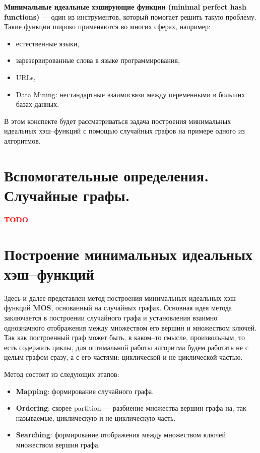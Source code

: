 \documentclass[specialist,
               substylefile = spbu.rtx,
               subf,href,colorlinks=true, 12pt]{disser}
\begin{document}
\textbf{Минимальные идеальные хэширующие функции (minimal perfect hash functions)} --- один из инструментов, который помогает решить такую проблему. Такие функции широко применяются во многих сферах, например:

\begin{itemize}
\item естественные языки,
\item зарезервированные слова в языке программирования,
\item URLs,
\item Data Mining: нестандартные взаимосвязи между переменными в больших базах данных.
\end{itemize}

В этом конспекте будет рассматриваться задача построения минимальных идеальных хэш--функций с помощью случайных графов на примере одного из алгоритмов.

\newpage

\section{Вспомогательные определения. Случайные графы.}

\textcolor{red}{\textbf{TODO}}

\newpage

\section{Построение минимальных идеальных хэш--функций}

Здесь и далее представлен метод построения минимальных идеальных хэш--функций \textbf{MOS}, основанный на случайных графах.
Основная идея метода заключается в построении случайного графа и установления взаимно однозначного отображения между множеством его вершин и множеством ключей. Так как построенный граф может быть, в каком--то смысле, произвольным, то есть содержать циклы, для оптимальной работы алгоритма будем работать не с целым графом сразу, а с его частями: циклической и не циклической частью. 

Метод состоит из следующих этапов:

\begin{itemize}
\item \textbf{Mapping}: формирование случайного графа.
\item \textbf{Ordering}: скорее partition --- разбиение множества вершин графа на, так называемые, циклическую и не циклическую часть.
\item \textbf{Searching}: формирование отображения между множеством ключей множеством вершин графа.
\end{itemize}
\end{document}
